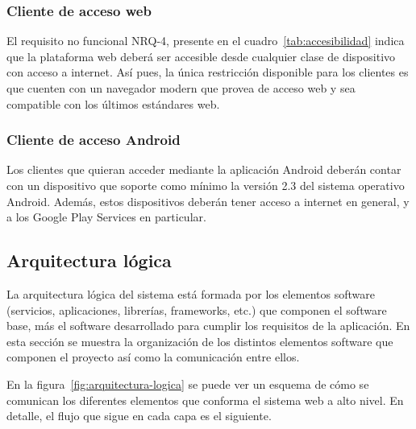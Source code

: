 \subsubsection{Cliente de acceso web}

El requisito no funcional NRQ-4, presente en el cuadro~\ref{tab:accesibilidad}
indica que la plataforma web deberá ser accesible desde cualquier clase de
dispositivo con acceso a internet. Así pues, la única restricción disponible
para los clientes es que cuenten con un navegador modern que provea de acceso
web y sea compatible con los últimos estándares web.

\subsubsection{Cliente de acceso Android}

Los clientes que quieran acceder mediante la aplicación Android deberán contar
con un dispositivo que soporte como mínimo la versión 2.3 del sistema operativo
Android. Además, estos dispositivos deberán tener acceso a internet en general,
y a los Google Play Services en particular.

\subsection{Arquitectura lógica}

La arquitectura lógica del sistema está formada por los elementos software
(servicios, aplicaciones, librerías, frameworks, etc.) que componen el software
base, más el software desarrollado para cumplir los requisitos de la
aplicación. En esta sección se muestra la organización de los distintos
elementos software que componen el proyecto así como la comunicación entre
ellos. 

En la figura~\ref{fig:arquitectura-logica} se puede ver un esquema de cómo se
comunican los diferentes elementos que conforma el sistema web a alto nivel. En
detalle, el flujo que sigue en cada capa es el siguiente.

